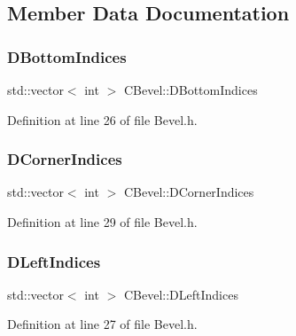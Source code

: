 \subsection{Member Data Documentation}
\hypertarget{classCBevel_a1593dec2a677674416284cba85516d5a}{}\label{classCBevel_a1593dec2a677674416284cba85516d5a} 
\subsubsection{\texorpdfstring{D\+Bottom\+Indices}{DBottomIndices}}
{\footnotesize\ttfamily std\+::vector$<$ int $>$ C\+Bevel\+::\+D\+Bottom\+Indices\hspace{0.3cm}{\ttfamily [protected]}}



Definition at line 26 of file Bevel.\+h.

\hypertarget{classCBevel_ab5e1c6e9de178bdfbdb87796945a289e}{}\label{classCBevel_ab5e1c6e9de178bdfbdb87796945a289e} 
\subsubsection{\texorpdfstring{D\+Corner\+Indices}{DCornerIndices}}
{\footnotesize\ttfamily std\+::vector$<$ int $>$ C\+Bevel\+::\+D\+Corner\+Indices\hspace{0.3cm}{\ttfamily [protected]}}



Definition at line 29 of file Bevel.\+h.

\hypertarget{classCBevel_a8ae622f8be35f17dbb6e492864bae9ce}{}\label{classCBevel_a8ae622f8be35f17dbb6e492864bae9ce} 
\subsubsection{\texorpdfstring{D\+Left\+Indices}{DLeftIndices}}
{\footnotesize\ttfamily std\+::vector$<$ int $>$ C\+Bevel\+::\+D\+Left\+Indices\hspace{0.3cm}{\ttfamily [protected]}}



Definition at line 27 of file Bevel.\+h.

